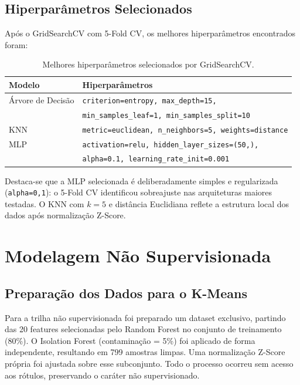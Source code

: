 \documentclass[12pt, a4paper]{article}
\begin{document}
\subsection{Hiperparâmetros Selecionados}

Após o GridSearchCV com 5-Fold CV, os melhores hiperparâmetros encontrados
foram:

\begin{table}[H]
\centering
\caption{Melhores hiperparâmetros selecionados por GridSearchCV.}
\label{tab:hiperparametros}
\small
\begin{tabularx}{\textwidth}{lX}
\toprule
\textbf{Modelo} & \textbf{Hiperparâmetros} \\
\midrule
Árvore de Decisão &
  \texttt{criterion=entropy, max\_depth=15,}\\
  & \texttt{min\_samples\_leaf=1, min\_samples\_split=10} \\
\addlinespace
KNN &
  \texttt{metric=euclidean, n\_neighbors=5, weights=distance} \\
\addlinespace
MLP &
  \texttt{activation=relu, hidden\_layer\_sizes=(50,),}\\
  & \texttt{alpha=0.1, learning\_rate\_init=0.001} \\
\bottomrule
\end{tabularx}
\end{table}

Destaca-se que a MLP selecionada é deliberadamente simples e regularizada
(\texttt{alpha=0,1}): o 5-Fold CV identificou sobreajuste nas arquiteturas
maiores testadas. O KNN com $k=5$ e distância Euclidiana reflete a estrutura
local dos dados após normalização Z-Score.

\section{Modelagem Não Supervisionada}

\subsection{Preparação dos Dados para o K-Means}

Para a trilha não supervisionada foi preparado um dataset exclusivo, partindo
das 20 features selecionadas pelo Random Forest no conjunto de treinamento
(80\%). O Isolation Forest (contaminação = 5\%) foi aplicado de forma
independente, resultando em 799 amostras limpas. Uma normalização Z-Score
própria foi ajustada sobre esse subconjunto. Todo o processo ocorreu sem acesso
aos rótulos, preservando o caráter não supervisionado.
\end{document}
